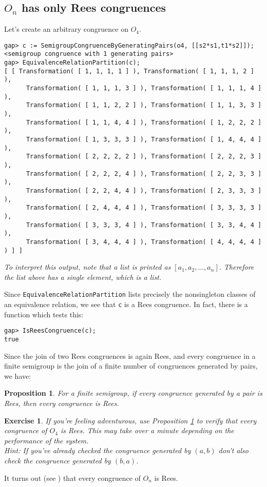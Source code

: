 \documentclass[12pt]{article}
\theoremstyle{plain} \newtheorem{Thm}{Theorem}
\theoremstyle{plain} \newtheorem{Cor}{Corollary}
\theoremstyle{plain} \newtheorem{Lemma}{Lemma}
\theoremstyle{plain} \newtheorem{Prop}{Proposition}
\theoremstyle{plain} \newtheorem{Ex}{Exercise}
\begin{document}
\subsection{$O_n$ has only Rees congruences}
Let's create an arbitrary congruence on $O_4$.
\begin{verbatim}
gap> c := SemigroupCongruenceByGeneratingPairs(o4, [[s2*s1,t1*s2]]);
<semigroup congruence with 1 generating pairs>
gap> EquivalenceRelationPartition(c);
[ [ Transformation( [ 1, 1, 1, 1 ] ), Transformation( [ 1, 1, 1, 2 ] ), 
      Transformation( [ 1, 1, 1, 3 ] ), Transformation( [ 1, 1, 1, 4 ] ), 
      Transformation( [ 1, 1, 2, 2 ] ), Transformation( [ 1, 1, 3, 3 ] ), 
      Transformation( [ 1, 1, 4, 4 ] ), Transformation( [ 1, 2, 2, 2 ] ), 
      Transformation( [ 1, 3, 3, 3 ] ), Transformation( [ 1, 4, 4, 4 ] ), 
      Transformation( [ 2, 2, 2, 2 ] ), Transformation( [ 2, 2, 2, 3 ] ), 
      Transformation( [ 2, 2, 2, 4 ] ), Transformation( [ 2, 2, 3, 3 ] ), 
      Transformation( [ 2, 2, 4, 4 ] ), Transformation( [ 2, 3, 3, 3 ] ), 
      Transformation( [ 2, 4, 4, 4 ] ), Transformation( [ 3, 3, 3, 3 ] ), 
      Transformation( [ 3, 3, 3, 4 ] ), Transformation( [ 3, 3, 4, 4 ] ), 
      Transformation( [ 3, 4, 4, 4 ] ), Transformation( [ 4, 4, 4, 4 ] ) ] ]
\end{verbatim}
{\em To interpret this output, note that  a list is printed as 
$[a_1, a_2, \ldots, a_n]$. Therefore the list above has a single
element, which is a list.}

Since {\tt EquivalenceRelationPartition} lists precisely the  nonsingleton
classes of an equivalence relation, we see that {\tt c} is a Rees congruence.
In fact, there is a function which tests this:

\begin{verbatim}
gap> IsReesCongruence(c);
true
\end{verbatim}

Since the join of two Rees congruences is again Rees, 
and every congruence in a finite semigroup is the join of a
finite number of congruences generated by pairs,  we have:
\begin{Prop}\label{reespair}
For a finite semigroup, if every congruence generated by a pair 
is Rees, then every congruence is Rees.
\end{Prop}

\begin{Ex} If you're feeling adventurous, use Proposition \ref{reespair}
to verify that every congruence of $O_4$ is Rees. This may take over a minute
depending on the performance of the system.\\
{\rm Hint: If you've already checked the congruence generated by $(a,b)$ don't 
also check the congruence generated by $(b,a)$.}
\end{Ex}
It turns out (see \cite{tglsol99}) that every congruence of $O_n$ is Rees. 
\end{document}
